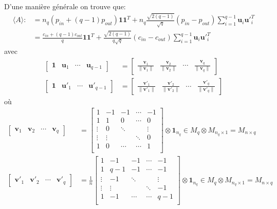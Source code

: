 D'une manière générale on trouve que:
\begin{align} 
\langle A \rangle :&= n_q(p_{in} + (q-1)p_{out}) \mathbf{11}^T + n_q\frac{\sqrt{2(q-1)}}{\sqrt{q}}(p_{in}-p_{out})\sum_{i=1}^{q-1}\mathbf{u}_i\mathbf{u'}_i^T\\
				   &= \frac{c_{in} + (q-1)c_{out}}{q} \mathbf{11}^T + \frac{\sqrt{2(q-1)}}{q\sqrt{q}}(c_{in}-c_{out})\sum_{i=1}^{q-1}\mathbf{u}_i\mathbf{u'}_i^T
\end{align}
avec
\begin{align*}
\begin{bmatrix}
\mathbf{1} & \mathbf{u}_1 & \cdots & \mathbf{u}_{q - 1}
\end{bmatrix} 
&=
\begin{bmatrix}
\frac{\mathbf{v}_1}{\parallel \mathbf{v}_1 \parallel} & \frac{\mathbf{v}_2}{\parallel \mathbf{v}_2 \parallel} & \cdots & \frac{\mathbf{v}_q}{\parallel \mathbf{v}_q \parallel}
\end{bmatrix}\\
\begin{bmatrix}
\mathbf{1} & \mathbf{u'}_1 & \cdots & \mathbf{u'}_{q - 1}
\end{bmatrix} 
&=
\begin{bmatrix}
\frac{\mathbf{v'}_1}{\parallel \mathbf{v'}_1 \parallel} & \frac{\mathbf{v'}_2}{\parallel \mathbf{v'}_2 \parallel} & \cdots & \frac{\mathbf{v'}_q}{\parallel \mathbf{v'}_q \parallel}
\end{bmatrix}
\end{align*}
où 
\begin{align*}
\begin{bmatrix}
\mathbf{v}_1 & \mathbf{v}_2 &  \cdots & \mathbf{v}_{q}
\end{bmatrix} 
&=
\begin{bmatrix}
1 & -1 & -1 & \cdots & -1 \\
1 & 1 & 0 & \cdots & 0 \\
\vdots & 0 & \ddots &  & \vdots \\
\vdots & \vdots &  & \ddots & 0 \\
1 & 0 & \cdots& \cdots & 1 \\
\end{bmatrix} \otimes \mathbf{1}_{n_q} \in \mathit{M}_q \otimes \mathit{M}_{n_q\times1}=\mathit{M}_{n\times q}\\
\begin{bmatrix}
\mathbf{v'}_1 & \mathbf{v'}_2 &  \cdots & \mathbf{v'}_{q}
\end{bmatrix} 
&= \frac{1}{n}
\begin{bmatrix}
1 & -1 & -1 & \cdots & -1 \\
1 & q -1 & -1 & \cdots & -1 \\
\vdots & -1 & \ddots &  & \vdots \\
\vdots & \vdots &  & \ddots & -1 \\
1 & -1 & \cdots& \cdots & q-1 \\
\end{bmatrix}\otimes \mathbf{1}_{n_q} \in \mathit{M}_q \otimes \mathit{M}_{n_q\times1}=\mathit{M}_{n\times q}\\
\end{align*}

